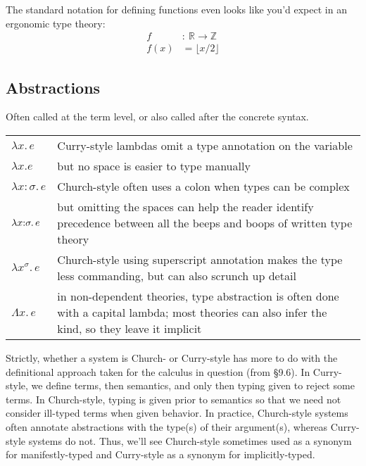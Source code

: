 \documentclass[11pt]{article} %
\theoremstyle{definition}
\theoremstyle{remark}
\begin{document}
The standard notation for defining functions even looks like you'd expect in an ergonomic type theory:
\begin{align*}
f &:\:\! \mathbb R \to \mathbb Z \\
f(x) &= \lfloor x/2 \rfloor
\end{align*}

\subsection{Abstractions}

Often called  at the term level, or also called  after the concrete syntax.

\begin{center}
\renewcommand{\arraystretch}{1.2}
\begin{tabular}{lp{10cm}}
$\lambda x.\,e$ & Curry-style lambdas omit a type annotation on the variable \\
$\lambda x.e$ & but no space is easier to type manually \\
$\lambda x:\sigma.\,e$ & Church-style often uses a colon when types can be complex \\
$\lambda x\mathord:\sigma.\,e$
  & but omitting the spaces can help the reader identify precedence between all the beeps and boops of written type theory \\
$\lambda x^\sigma.\,e$
  & Church-style using superscript annotation makes the type less commanding, but can also scrunch up detail \\
$\Lambda x.\,e$
  & in non-dependent theories, type abstraction is often done with a capital lambda; most theories can also infer the kind, so they leave it implicit \\
\end{tabular}
\end{center}

Strictly, whether a system is Church- or Curry-style has more to do with the definitional approach taken for the calculus in question (from \cite{tapl} \S9.6).
In Curry-style, we define terms, then semantics, and only then typing given to reject some terms.
In Church-style, typing is given prior to semantics so that we need not consider ill-typed terms when given behavior.
In practice, Church-style systems often annotate abstractions with the type(s) of their argument(s), whereas Curry-style systems do not.
Thus, we'll see Church-style sometimes used as a synonym for manifestly-typed and Curry-style as a synonym for implicitly-typed.
\end{document}
